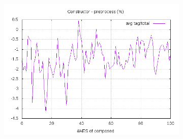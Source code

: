 \documentclass[10pt,a4paper]{article}
\begin{document}
\begin{figure}[h]
\begin{subfigure}[t]{0.3\textwidth}
        \caption{}
        \label{data const preprocess avg}
    \end{subfigure}
    \begin{subfigure}[t]{0.3\textwidth}
        \includegraphics[width=\textwidth]{const_preprocess_frac}
        \caption{}
        \label{data const preprocess frac}
    \end{subfigure}


\end{figure}
\end{document}
